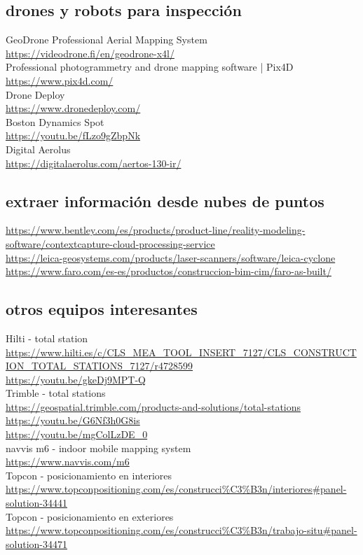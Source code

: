 \documentclass[spanish,12pt,a4paper,final,oneside]{book}
\begin{document}
\subsection{drones y robots para inspección}
GeoDrone Professional Aerial Mapping System \\ \url{https://videodrone.fi/en/geodrone-x4l/}
\\Professional photogrammetry and drone mapping software | Pix4D \\ \url{https://www.pix4d.com/}
\\Drone Deploy \\ \url{https://www.dronedeploy.com/}
\\Boston Dynamics Spot \\ \url{https://youtu.be/fLzo9gZbpNk}
\\Digital Aerolus \\ \url{https://digitalaerolus.com/aertos-130-ir/}

\subsection{extraer información desde nubes de puntos}
\url{https://www.bentley.com/es/products/product-line/reality-modeling-software/contextcapture-cloud-processing-service}
\\ \url{https://leica-geosystems.com/products/laser-scanners/software/leica-cyclone}
\\ \url{https://www.faro.com/es-es/productos/construccion-bim-cim/faro-as-built/}

\subsection{otros equipos interesantes}
Hilti - total station \\ \url{https://www.hilti.es/c/CLS_MEA_TOOL_INSERT_7127/CLS_CONSTRUCTION_TOTAL_STATIONS_7127/r4728599} \\ \url{https://youtu.be/gkeDj9MPT-Q} 
\\ Trimble - total stations \\ \url{https://geospatial.trimble.com/products-and-solutions/total-stations} \\ \url{https://youtu.be/G6Nf3h0G8is} \\ \url{https://youtu.be/mgColLzDE_0}
\\ navvis m6 - indoor mobile mapping system \\ \url{https://www.navvis.com/m6}
\\ Topcon - posicionamiento en interiores \\ \url{https://www.topconpositioning.com/es/construcci%C3%B3n/interiores#panel-solution-34441}
\\ Topcon - posicionamiento en exteriores \\ \url{https://www.topconpositioning.com/es/construcci%C3%B3n/trabajo-situ#panel-solution-34471}
\end{document}
